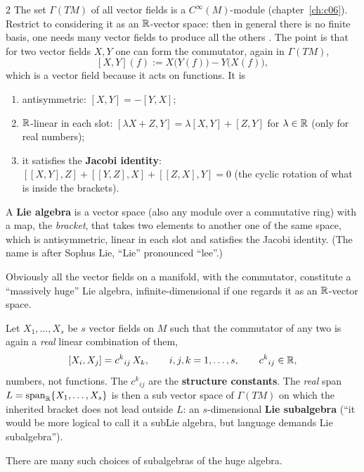 \begin{paracol}{2}
The set $\Gamma(TM)$ of all vector fields is a $C^\infty(M)$-module (chapter~\ref{ch:c06}). Restrict to considering it as an $\mathbb{R}$-vector space: then in general there is no finite basis, one needs many vector fields to produce all the others . The point is that for two vector fields $X,Y$ one can form the commutator, again in $\Gamma(TM)$,
\[
  [X,Y](f):=X\bigl(Y(f)\bigr)-Y\bigl(X(f)\bigr),
\]
which is a vector field because it acts on functions. It is
\begin{enumerate}
  \item antisymmetric: $[X,Y]=-[Y,X]$;
  \item $\mathbb{R}$-linear in each slot: $[\lambda X+Z,Y]=\lambda[X,Y]+[Z,Y]$ for $\lambda\in\mathbb{R}$ (only for real numbers);
  \item it satisfies the \textbf{Jacobi identity}: $[[X,Y],Z]+[[Y,Z],X]+[[Z,X],Y]=0$ (the cyclic rotation of what is inside the brackets).
\end{enumerate}

\begin{definition}\label{def:c11-liealg}
A \textbf{Lie algebra} is a vector space (also any module over a commutative ring) with a map, the \emph{bracket}, that takes two elements to another one of the same space, which is antisymmetric, linear in each slot and satisfies the Jacobi identity. (The name is after Sophus Lie, ``Lie'' pronounced ``lee''.)
\end{definition}
Obviously all the vector fields on a manifold, with the commutator, constitute a ``massively huge'' Lie algebra, infinite-dimensional if one regards it as an $\mathbb{R}$-vector space.

\begin{definition}\label{def:c11-subalg}
Let $X_1,\dots,X_s$ be $s$ vector fields on $M$ such that the commutator of any two is again a \emph{real} linear combination of them,
\[
  [X_i,X_j]=c^k{}_{ij}\,X_k,\qquad i,j,k=1,\dots,s,\qquad c^k{}_{ij}\in\mathbb{R},
\]
numbers, not functions. The $c^k{}_{ij}$ are the \textbf{structure constants}. The \emph{real} span $L=\mathrm{span}_{\mathbb{R}}\{X_1,\dots,X_s\}$ is then a sub vector space of $\Gamma(TM)$ on which the inherited bracket does not lead outside $L$: an $s$-dimensional \textbf{Lie subalgebra} (``it would be more logical to call it a subLie algebra, but language demands Lie subalgebra'').
\end{definition}
There are many such choices of subalgebras of the huge algebra.


\end{paracol}
